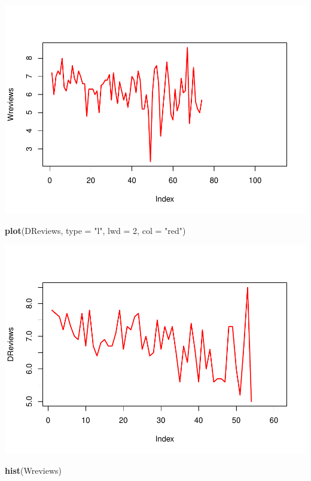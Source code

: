 \documentclass[]{article}
\newenvironment{Shaded}{\begin{snugshade}}{\end{snugshade}}
\newcommand{\DataTypeTok}[1]{\textcolor[rgb]{0.13,0.29,0.53}{#1}}
\newcommand{\DecValTok}[1]{\textcolor[rgb]{0.00,0.00,0.81}{#1}}
\newcommand{\KeywordTok}[1]{\textcolor[rgb]{0.13,0.29,0.53}{\textbf{#1}}}
\newcommand{\NormalTok}[1]{#1}
\newcommand{\StringTok}[1]{\textcolor[rgb]{0.31,0.60,0.02}{#1}}
\begin{document}
\includegraphics{Denzel-v-Will-data_files/figure-latex/unnamed-chunk-6-1.pdf}

\begin{Shaded}
\begin{Highlighting}[]
\KeywordTok{plot}\NormalTok{(DReviews, }\DataTypeTok{type =} \StringTok{"l"}\NormalTok{, }\DataTypeTok{lwd =} \DecValTok{2}\NormalTok{, }\DataTypeTok{col =} \StringTok{"red"}\NormalTok{)}
\end{Highlighting}
\end{Shaded}

\includegraphics{Denzel-v-Will-data_files/figure-latex/unnamed-chunk-6-2.pdf}

\begin{Shaded}
\begin{Highlighting}[]
\KeywordTok{hist}\NormalTok{(Wreviews)}
\end{Highlighting}
\end{Shaded}
\end{document}

